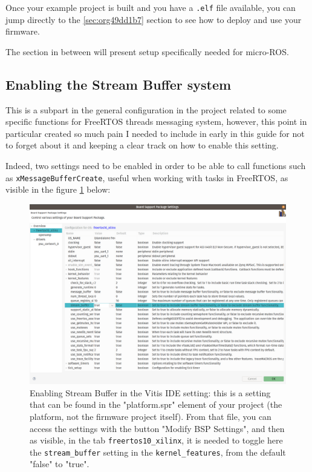 \documentclass[10pt]{article}
\begin{document}
Once your example project is built and you have a \texttt{.elf} file available, you can
jump directly to the \ref{sec:org49dd1b7} section to see how to deploy and use your firmware.

The section in between will present setup specifically needed for micro-ROS.

\subsection{Enabling the Stream Buffer system}
\label{sec:org4aa976e}
This is a subpart in the general configuration in the project related to some specific
functions for FreeRTOS threads messaging system, however, this point in particular
created so much pain I needed to include in early in this guide for not to forget about it
and keeping a clear track on how to enable this setting.

Indeed, two settings need to be enabled in order to be able to call
functions such as \texttt{xMessageBufferCreate}, useful when working with tasks
in FreeRTOS, as visible in the figure \ref{fig:orge49672f} below:

\begin{figure}[htbp]
\centering
\includegraphics[width=.8\textwidth]{./img/streambuffer.png}
\caption{\label{fig:orge49672f}Enabling Stream Buffer in the Vitis IDE setting: this is a setting that can be found in the "platform.spr" element of your project (the platform, not the firmware project itself). From that file, you can access the settings with the button "Modify BSP Settings", and then as visible, in the tab \texttt{freertos10\_xilinx}, it is needed to toggle here the \texttt{stream\_buffer} setting in the \texttt{kernel\_features}, from the default "false" to "true".}
\end{figure}
\end{document}
